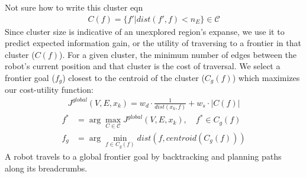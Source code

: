 \documentclass[a4paper, 10pt, conference]{ieeeconf}      %
\newcommand{\todo}[1]{{\color{red} #1 }} %
\begin{document}
\todo{Not sure how to write this cluster eqn}
\begin{align}
    C(f) = \{ f' | dist(f', f) < n_{E} \}\in\mathcal{C} 
\end{align}
Since cluster size is indicative of an unexplored region's expanse, we use it to predict expected information gain, or the utility of traversing to a frontier in that cluster ($C(f)$). For a given cluster, the minimum number of edges between the robot's current position and that cluster is the cost of traversal. We select a frontier goal ($f_g$) closest to the centroid of the cluster ($C_g(f)$) which maximizes our cost-utility function:
\begin{align}
    J^{global}(V, E, x_k) = w_{d} \cdot \frac{1}{dist(x_k, f)} + w_{s} \cdot |C(f)|
\end{align}
\begin{align}
    f^{*} &= \arg\max_{C\in \mathcal{C}} J^{global}(V, E, x_k), \quad  f^* \in C_g(f)\\
    f_g &= \arg\min_{f\in C_g(f)} dist(f, centroid(C_g(f)))
\end{align}
A robot travels to a global frontier goal by backtracking and planning paths along its breadcrumbs.







\end{document}
